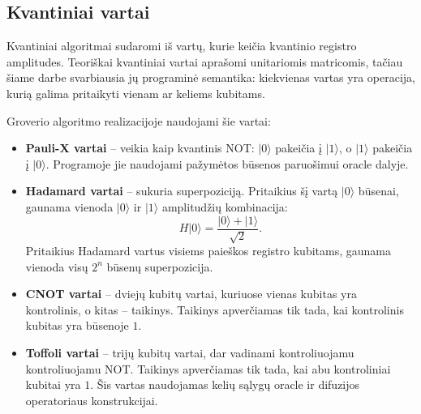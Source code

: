 \subsection{Kvantiniai vartai}
\label{sec:kvantiniai-vartai}

Kvantiniai algoritmai sudaromi iš vartų, kurie keičia kvantinio registro amplitudes. Teoriškai kvantiniai vartai aprašomi unitariomis matricomis, tačiau šiame darbe svarbiausia jų programinė semantika: kiekvienas vartas yra operacija, kurią galima pritaikyti vienam ar keliems kubitams.

Groverio algoritmo realizacijoje naudojami šie vartai:

\begin{itemize}
    \item \textbf{Pauli-X vartai} -- veikia kaip kvantinis NOT: $\lvert 0 \rangle$ pakeičia į $\lvert 1 \rangle$, o $\lvert 1 \rangle$ pakeičia į $\lvert 0 \rangle$. Programoje jie naudojami pažymėtos būsenos paruošimui oracle dalyje.
    \item \textbf{Hadamard vartai} -- sukuria superpoziciją. Pritaikius šį vartą $\lvert 0 \rangle$ būsenai, gaunama vienoda $\lvert 0 \rangle$ ir $\lvert 1 \rangle$ amplitudžių kombinacija:
    \begin{equation}
        H\lvert 0 \rangle = \frac{\lvert 0 \rangle + \lvert 1 \rangle}{\sqrt{2}}.
    \end{equation}
    Pritaikius Hadamard vartus visiems paieškos registro kubitams, gaunama vienoda visų $2^n$ būsenų superpozicija.
    \item \textbf{CNOT vartai} -- dviejų kubitų vartai, kuriuose vienas kubitas yra kontrolinis, o kitas -- taikinys. Taikinys apverčiamas tik tada, kai kontrolinis kubitas yra būsenoje $1$.
    \item \textbf{Toffoli vartai} -- trijų kubitų vartai, dar vadinami kontroliuojamu kontroliuojamu NOT. Taikinys apverčiamas tik tada, kai abu kontroliniai kubitai yra $1$. Šis vartas naudojamas kelių sąlygų oracle ir difuzijos operatoriaus konstrukcijai.
\end{itemize}
